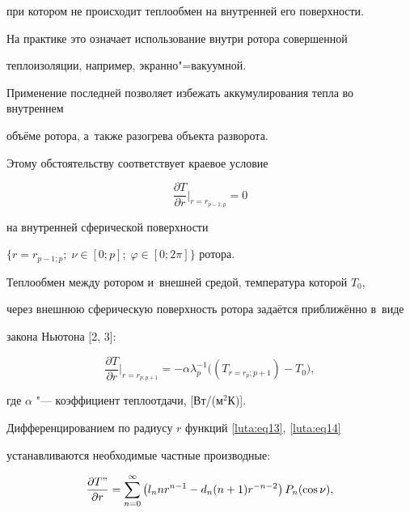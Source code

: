 {{{{{{{{{{{при котором не происходит теплообмен на внутренней его поверхности.

На практике это означает использование внутри ротора совершенной

теплоизоляции, например, экранно"=вакуумной.

Применение последней позволяет избежать аккумулирования тепла во внутреннем

объёме ротора, а~также разогрева объекта разворота.

Этому обстоятельству соответствует краевое условие

\begin{equation}

\label{luta:eq22}

\frac{\partial T}{\partial r}\Big|_{r=r_{p-1; p} } =0

\end{equation}

на внутренней сферической поверхности

$\bigl\{ r=r_{p-1; p} ;\; \nu \in [0; p];\; \varphi \in [0; 2\pi ] \bigr\}$ ротора.

Теплообмен между ротором и~внешней средой, температура которой $T_0$,

через внешнюю сферическую поверхность ротора задаётся приближённо в~виде

закона Ньютона [2, 3]:

\begin{equation}

\label{luta:eq23}

\frac{\partial T}{\partial r}\Big|_{r=r_{p; p+1} }

=-\alpha \lambda _p^{-1}\bigl((T_{r=r_p; p+1})-T_0 \bigr),

\end{equation}

где $\alpha $ "--- коэффициент теплоотдачи, [Вт/(м$^{2}$К)].

Дифференцированием по радиусу $r$ функций \eqref{luta:eq13}, \eqref{luta:eq14}

устанавливаются необходимые частные производные:

\begin{equation}

\label{luta:eq24}

\frac{\partial T"}{\partial r}=

\sum\limits_{n=0}^\infty

\left( l_n nr^{n-1}-d_n (n+1)r^{-n-2} \right)P_n (\cos \nu ) ,


\end{equation}}}}}}}}}}}}
